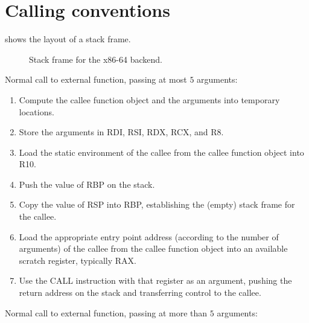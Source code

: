 \section{Calling conventions}

 shows the layout of a stack frame.

\begin{figure}
\begin{center}
\end{center}
\caption{\label{fig-x86-64-stack-frame}
Stack frame for the x86-64 backend.}
\end{figure}

Normal call to external function, passing at most $5$ arguments:

\begin{enumerate}
\item Compute the callee function object and the arguments into
  temporary locations.
\item Store the arguments in RDI, RSI, RDX, RCX, and R8.
\item Load the static environment of the callee from the callee
  function object into R10.
\item Push the value of RBP on the stack.
\item Copy the value of RSP into RBP, establishing the
  (empty) stack frame for the callee.
\item Load the appropriate entry point address (according to the
  number of arguments) of the callee from the callee function object
  into an available scratch register, typically RAX.
\item Use the CALL instruction with that register as an argument,
  pushing the return address on the stack and transferring control to
  the callee.
\end{enumerate}

Normal call to external function, passing at more than $5$ arguments:


